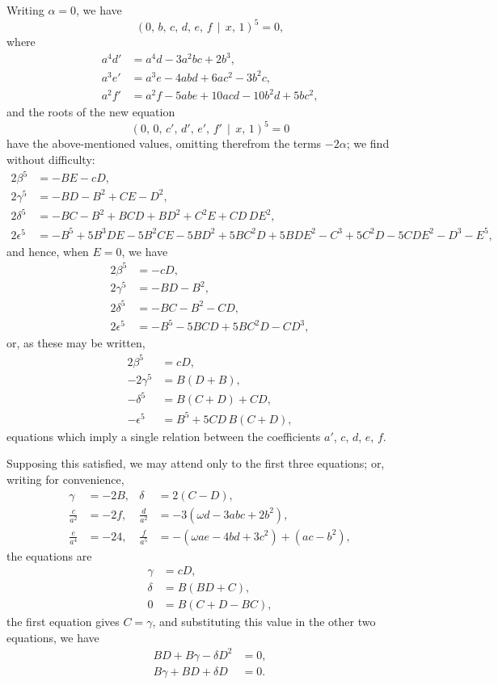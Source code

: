 \documentclass[11pt,a4paper]{book}
\begin{document}
Writing $\alpha=0$, we have
\[
(0,\, b,\, c,\, d,\, e,\, f \,\!\!\mid\!\!\, x,\, 1)^{5} = 0,
\]
where
\begin{align*}
a^{4}d' &= a^{4}d - 3a^{2}bc + 2b^{3},\\
a^{3}e' &= a^{3}e - 4abd + 6ac^{2} - 3b^{2}c,\\
a^{2}f' &= a^{2}f - 5abe + 10acd - 10b^{2}d + 5bc^{2},
\end{align*}
and the roots of the new equation
\[
(0,\, 0,\, c',\, d',\, e',\, f' \,\!\!\mid\!\!\, x,\, 1)^{5} = 0
\]
have the above-mentioned values, omitting therefrom the terms $-2\alpha$; we find without difficulty:
\begin{align*}
2\beta^{5} &= -BE - cD,\\
2\gamma^{5} &= -BD - B^{2} + CE - D^{2},\\
2\delta^{5} &= -BC - B^{2} + BCD + BD^{2} + C^{2}E + CD\,DE^{2},\\
2\epsilon^{5} &= -B^{5} + 5B^{3}DE - 5B^{2}CE - 5BD^{2} + 5BC^{2}D + 5BDE^{2} - C^{3} + 5C^{2}D - 5CDE^{2} - D^{3} - E^{5},
\end{align*}
and hence, when $E=0$, we have
\begin{align*}
2\beta^{5} &= -cD,\\
2\gamma^{5} &= -BD - B^{2},\\
2\delta^{5} &= -BC - B^{2} - CD,\\
2\epsilon^{5} &= -B^{5} - 5BCD + 5BC^{2}D - CD^{3},
\end{align*}
or, as these may be written,
\begin{align*}
2\beta^{5} &= cD,\\
-2\gamma^{5} &= B(D+B),\\
-\delta^{5} &= B(C+D) + CD,\\
-\epsilon^{5} &= B^{5} + 5CD\,B(C+D),
\end{align*}
equations which imply a single relation between the coefficients $a'$, $c$, $d$, $e$, $f$.

Supposing this satisfied, we may attend only to the first three equations; or, writing for convenience,
\begin{align*}
\gamma &= -2B, & \delta &= 2(C-D),\\
\frac{c}{a^{2}} &= -2f, & \frac{d}{a^{2}} &= -3(\omega d - 3abc + 2b^{2}),\\
\frac{e}{a^{4}} &= -24, & \frac{f}{a^{5}} &= -(\omega ae - 4bd + 3c^{2}) + (ac - b^{2}),
\end{align*}
the equations are
\begin{align*}
\gamma &= cD,\\
\delta &= B(BD+C),\\
0 &= B(C+D-BC),
\end{align*}
the first equation gives $C = \gamma$, and substituting this value in the other two equations, we have
\begin{align*}
BD + B\gamma - \delta D^{2} &= 0,\\
B\gamma + BD + \delta D &= 0.
\end{align*}
\end{document}
